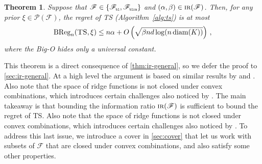 \documentclass[letter, 12pt]{report}
\newcommand{\pr}{\text{\tiny\texttt{r}}}
\newcommand{\pb}{\text{\tiny\texttt{b}}}
\newcommand{\pl}{\text{\tiny\texttt{l}}}
\renewcommand{\pm}{\text{\tiny\texttt{m}}}
\newcommand{\BReg}{\textrm{BReg}}
\newcommand{\sF}{\mathscr F}
\newcommand{\sP}{\mathscr P}
\newcommand{\diam}{\operatorname{diam}}
\newcommand{\1}{\mathbf{1}}
\newcommand{\IR}{\operatorname{\textsc{ir}}}
\newcommand{\ts}{\textsc{TS}\xspace}
\theoremstyle{plain}
\newtheorem{theorem}{Theorem}
\theoremstyle{definition}
\theoremstyle{remark}
\begin{document}
\begin{theorem}\label{thm:ts-ir-regret}
    Suppose that $\sF \in \{\sF_{\pb\pl}, \sF_{\pb\pl\pr\pm}\}$ and $(\alpha, \beta) \in \IR(\sF)$.
    Then, for any prior $\xi \in \sP(\sF)$, the regret of \ts{} (Algorithm~\ref{alg:ts}) is at most
    \begin{align*}
        \BReg_n(\ts, \xi) \leq n \alpha + O\left(\sqrt{\beta n d \log(n \diam(K))}\right) \,,
    \end{align*}
    where the Big-O hides only a universal constant.
\end{theorem}
This theorem is a direct consequence of \cref{thm:ir-general},
so we defer the proof to \cref{sec:ir-general}.
At a high level the argument is based on similar results by \cite{BDKP15} and \cite{BE18}.
Also note that the space of ridge functions is not closed under convex combinations, which introduces certain challenges also
noticed by \cite{lattimore2021minimax}.
The main takeaway is that bounding the information ratio $\IR(\sF)$ is sufficient to bound the regret of \ts.
Also note that the space of ridge functions is not closed under convex combinations, which introduces certain challenges also
noticed by \cite{lattimore2021minimax}.
To address this last issue, we introduce a cover in \cref{sec:cover} that let us
work with subsets of $\sF$ that are closed under convex combinations,
and also satisfy some other properties.
\end{document}
